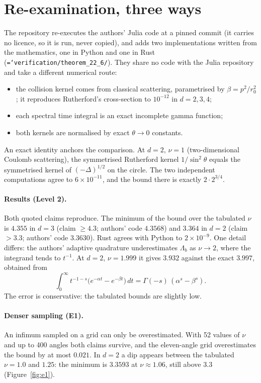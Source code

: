 \documentclass[11pt,a4paper,openany]{book}
\newcommand{\code}[1]{\texttt{\hyphenchar\font=`\-\relax #1}}
\theoremstyle{definition}
\theoremstyle{plain}
\begin{document}
\section{Re-examination, three ways}

The repository re-executes the authors' Julia code at a pinned commit (it carries no licence, so
it is run, never copied), and adds two implementations written from the mathematics, one in Python
and one in Rust (\code{verification/theorem\_22\_6/}). They share no code with the Julia
repository and take a different numerical route:
\begin{itemize}
  \item the collision kernel comes from classical scattering, parametrised by $\beta=p^2/r_0^2$;
        it reproduces Rutherford's cross-section to $10^{-12}$ in $d=2,3,4$;
  \item each spectral time integral is an exact incomplete gamma function;
  \item both kernels are normalised by exact $\theta\to0$ constants.
\end{itemize}
An exact identity anchors the comparison. At $d=2$, $\nu=1$ (two-dimensional Coulomb
scattering), the symmetrised Rutherford kernel $1/\sin^2\theta$ equals the symmetrised kernel of
$(-\Delta)^{1/2}$ on the circle. The two independent computations agree to $6\times10^{-11}$, and
the bound there is exactly $2\cdot2^{3/4}$.

\paragraph{Results (Level 2).} Both quoted claims reproduce. The minimum of the bound over the
tabulated $\nu$ is $4.355$ in $d=3$ (claim $\ge4.3$; authors' code $4.3568$) and $3.364$ in $d=2$
(claim $>3.3$; authors' code $3.3630$). Rust agrees with Python to $2\times10^{-9}$. One detail
differs: the authors' adaptive quadrature underestimates $\Lambda_b$ as $\nu\to2$, where the
integrand tends to $t^{-1}$. At $d=2$, $\nu=1.999$ it gives $3.932$ against the exact $3.997$,
obtained from
\begin{equation}
  \int_0^\infty t^{-1-s}\bigl(e^{-\alpha t}-e^{-\beta t}\bigr)\,dt=\Gamma(-s)\,(\alpha^s-\beta^s).
  \label{eq:gammaint}
\end{equation}
The error is conservative: the tabulated bounds are slightly low.

\paragraph{Denser sampling (E1).} An infimum sampled on a grid can only be overestimated. With 52
values of $\nu$ and up to 400 angles both claims survive, and the eleven-angle grid overestimates
the bound by at most $0.021$. In $d=2$ a dip appears between the tabulated $\nu=1.0$ and $1.25$:
the minimum is $3.3593$ at $\nu\approx1.06$, still above $3.3$ (Figure~\ref{fig:e1}).
\end{document}
